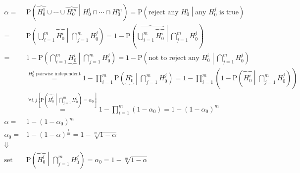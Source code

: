 \documentclass[
]{book}
\theoremstyle{definition}
\theoremstyle{definition}
\theoremstyle{definition}
\theoremstyle{definition}
\theoremstyle{remark}
\begin{document}
\[
\begin{aligned}
\alpha= & \mathrm{P}\left(\overbrace{H_{{\scriptscriptstyle 0}}^{{\scriptscriptstyle 1}}}\cup\cdots\cup\overbrace{H_{{\scriptscriptstyle 0}}^{{\scriptscriptstyle m}}}\middle|H_{{\scriptscriptstyle 0}}^{{\scriptscriptstyle 1}}\cap\cdots\cap H_{{\scriptscriptstyle 0}}^{{\scriptscriptstyle m}}\right)=\mathrm{P}\left(\text{reject any }H_{{\scriptscriptstyle 0}}^{{\scriptscriptstyle i}}\middle|\text{any }H_{{\scriptscriptstyle 0}}^{{\scriptscriptstyle j}}\text{ is true}\right)\\
= & \mathrm{P}\left(\bigcup\limits _{i=1}^{m}\overbrace{H_{{\scriptscriptstyle 0}}^{{\scriptscriptstyle i}}}\middle|\bigcap\limits _{j=1}^{m}H_{{\scriptscriptstyle 0}}^{{\scriptscriptstyle j}}\right)=1-\mathrm{P}\left(\overbrace{\bigcup\limits _{i=1}^{m}\overbrace{H_{{\scriptscriptstyle 0}}^{{\scriptscriptstyle i}}}}\middle|\bigcap\limits _{j=1}^{m}H_{{\scriptscriptstyle 0}}^{{\scriptscriptstyle j}}\right)\\
= & 1-\mathrm{P}\left(\bigcap\limits _{i=1}^{m}\underbrace{H_{{\scriptscriptstyle 0}}^{{\scriptscriptstyle i}}}\middle|\bigcap\limits _{j=1}^{m}H_{{\scriptscriptstyle 0}}^{{\scriptscriptstyle j}}\right)=1-\mathrm{P}\left(\text{not to reject any }H_{{\scriptscriptstyle 0}}^{{\scriptscriptstyle i}}\middle|\bigcap\limits _{j=1}^{m}H_{{\scriptscriptstyle 0}}^{{\scriptscriptstyle j}}\right)\\
 & \overset{H_{{\scriptscriptstyle 0}}^{{\scriptscriptstyle j}}\text{ pairwise independent}}{=}1-\prod\limits _{i=1}^{m}\mathrm{P}\left(\underbrace{H_{{\scriptscriptstyle 0}}^{{\scriptscriptstyle i}}}\middle|\bigcap\limits _{j=1}^{m}H_{{\scriptscriptstyle 0}}^{{\scriptscriptstyle j}}\right)=1-\prod\limits _{i=1}^{m}\left(1-\mathrm{P}\left(\overbrace{H_{{\scriptscriptstyle 0}}^{{\scriptscriptstyle i}}}\middle|\bigcap\limits _{j=1}^{m}H_{{\scriptscriptstyle 0}}^{{\scriptscriptstyle j}}\right)\right)\\
 & \overset{\forall i,j\left[\mathrm{P}\left(\overbrace{H_{{\scriptscriptstyle 0}}^{{\scriptscriptstyle i}}}\middle|\bigcap\limits _{j=1}^{m}H_{{\scriptscriptstyle 0}}^{{\scriptscriptstyle j}}\right)=\alpha_{{\scriptscriptstyle 0}}\right]}{=}1-\prod\limits _{i=1}^{m}\left(1-\alpha_{{\scriptscriptstyle 0}}\right)=1-\left(1-\alpha_{{\scriptscriptstyle 0}}\right)^{m}\\
\alpha= & 1-\left(1-\alpha_{{\scriptscriptstyle 0}}\right)^{m}\\
\alpha_{{\scriptscriptstyle 0}}= & 1-\left(1-\alpha\right)^{\frac{1}{m}}=1-\sqrt[m]{1-\alpha}\\
\Downarrow\\
\text{set } & \mathrm{P}\left(\overbrace{H_{{\scriptscriptstyle 0}}^{{\scriptscriptstyle i}}}\middle|\bigcap\limits _{j=1}^{m}H_{{\scriptscriptstyle 0}}^{{\scriptscriptstyle j}}\right)=\alpha_{{\scriptscriptstyle 0}}=1-\sqrt[m]{1-\alpha}
\end{aligned}
\]
\end{document}
